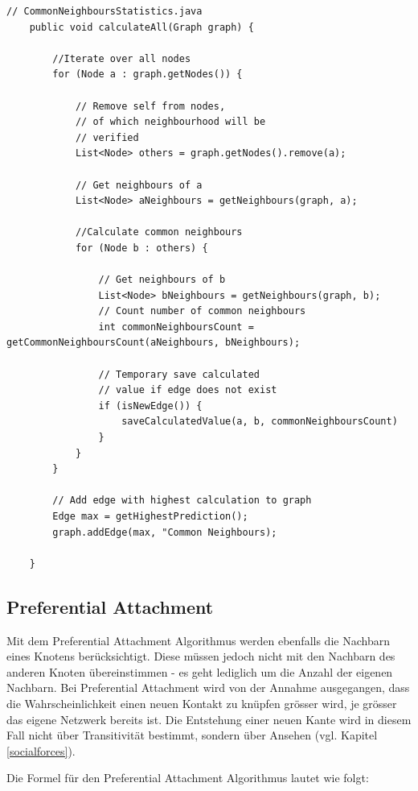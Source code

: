 \begin{lstlisting}[caption={Common neighbour implementation},label=lstCommonNeighbour]
    // CommonNeighboursStatistics.java
    public void calculateAll(Graph graph) {

        //Iterate over all nodes
        for (Node a : graph.getNodes()) {

            // Remove self from nodes,
            // of which neighbourhood will be
            // verified
            List<Node> others = graph.getNodes().remove(a);

            // Get neighbours of a
            List<Node> aNeighbours = getNeighbours(graph, a);

            //Calculate common neighbours
            for (Node b : others) {

                // Get neighbours of b
                List<Node> bNeighbours = getNeighbours(graph, b);
                // Count number of common neighbours
                int commonNeighboursCount = getCommonNeighboursCount(aNeighbours, bNeighbours);

                // Temporary save calculated
                // value if edge does not exist
                if (isNewEdge()) {
                    saveCalculatedValue(a, b, commonNeighboursCount)
                }
            }
        }

        // Add edge with highest calculation to graph
        Edge max = getHighestPrediction();
        graph.addEdge(max, "Common Neighbours);

    }
\end{lstlisting}

\subsection{Preferential Attachment}
Mit dem Preferential Attachment Algorithmus werden ebenfalls die Nachbarn eines Knotens berücksichtigt. Diese müssen jedoch nicht
mit den Nachbarn des anderen Knoten übereinstimmen - es geht lediglich um die Anzahl der eigenen Nachbarn. Bei Preferential Attachment
wird von der Annahme ausgegangen, dass die Wahrscheinlichkeit einen neuen Kontakt zu knüpfen grösser wird, je grösser das eigene Netzwerk bereits ist.
Die Entstehung einer neuen Kante wird in diesem Fall nicht über Transitivität bestimmt, sondern über Ansehen (vgl. Kapitel \ref{socialforces}).

Die Formel für den Preferential Attachment Algorithmus lautet wie folgt:

